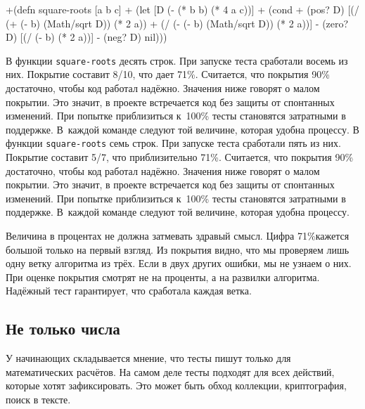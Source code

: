 \else

\begin{english}
  \begin{diff}
+(defn square-roots [a b c]
+  (let [D (- (* b b) (* 4 a c))]
+    (cond
+      (pos? D) [(/ (+ (- b) (Math/sqrt D)) (* 2 a))
+                (/ (- (- b) (Math/sqrt D)) (* 2 a))]
-      (zero? D) [(/ (- b) (* 2 a))]
-      (neg? D) nil)))
  \end{diff}
\end{english}
\fi

\ifnarrow

\def\covperc{80\%}

\else

\def\covperc{71\%}

\fi

\ifnarrow
В функции \verb|square-roots| десять строк. При запуске теста сработали восемь из
них. Покрытие составит 8/10, что дает \covperc. Считается, что покрытия
90\% достаточно, чтобы код работал надёжно. Значения ниже говорят о малом
покрытии. Это значит, в проекте встречается код без защиты от спонтанных
изменений. При попытке приблизиться к~100\% тесты становятся затратными в
поддержке. В~каждой команде следуют той величине, которая удобна процессу.
\else
В функции \verb|square-roots| семь строк. При запуске теста сработали пять из
них. Покрытие составит 5/7, что приблизительно \covperc. Считается, что покрытия
90\% достаточно, чтобы код работал надёжно. Значения ниже говорят о малом
покрытии. Это значит, в проекте встречается код без защиты от спонтанных
изменений. При попытке приблизиться к~100\% тесты становятся затратными в
поддержке. В~каждой команде следуют той величине, которая удобна процессу.
\fi

Величина в процентах не должна затмевать здравый смысл. Цифра \covperc кажется
большой только на первый взгляд. Из покрытия видно, что мы проверяем лишь одну
ветку алгоритма из трёх. Если в двух других ошибки, мы не узнаем о них. При
оценке покрытия смотрят не на проценты, а на развилки алгоритма. Надёжный тест
гарантирует, что сработала каждая ветка.

\subsection{Не только числа}

У начинающих складывается мнение, что тесты пишут только для математических
расчётов. На самом деле тесты подходят для всех действий, которые хотят
зафиксировать. Это может быть обход коллекции, криптография, поиск в тексте.

